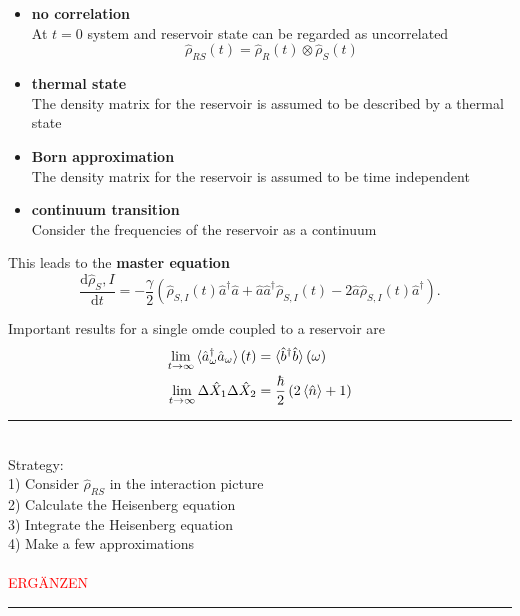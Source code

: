 \documentclass{article}
\newcommand{\diff}{\mathrm{d}}
\newcommand{\lr}[1]{\left(#1\right)}
\begin{document}
	\begin{itemize}
		\item \textbf{no correlation}\\
		At $t=0$ system and reservoir state can be regarded as uncorrelated
			$$\hat{\rho}_{RS}(t) = \hat{\rho}_R(t) \otimes \hat{\rho}_S(t)$$
		
		
		\item \textbf{thermal state}\\
		The density matrix for the reservoir is assumed to be described by a thermal state
		
		
		\item \textbf{Born approximation}\\
		The density matrix for the reservoir is assumed to be time independent
		
		
		\item \textbf{continuum transition}\\
		Consider the frequencies of the reservoir as a continuum
	\end{itemize}

This leads to the \textbf{master equation}
	\begin{equation}
		\frac{\diff \hat{\rho}_S,I}{\diff t} = - \frac{\gamma}{2} \lr{ \hat{\rho}_{S,I}(t) \hat{a}^\dagger \hat{a} + \hat{a}\hat{a}^\dagger \hat{\rho}_{S,I}(t) - 2 \hat{a} \hat{\rho}_{S,I}(t) \hat{a}^\dagger }.
	\end{equation}

Important results for a single omde coupled to a reservoir are
	\begin{align}
		\lim\limits_{t\to\infty} \braket{ \hat{a}_\omega^\dagger \hat{a}_\omega }(t) &= \braket{ \hat{b}^\dagger \hat{b} }(\omega) \\
		\lim\limits_{t\to\infty} \Delta\hat{X}_1 \Delta\hat{X}_2 &= \frac{\hbar}{2} \lr{ 2\braket{\hat{n}} + 1 }
	\end{align}

\vspace{0.5cm}

{\color{violet}
\hrule
	\\
	Strategy:\\
	1) Consider $\hat{\rho}_{RS}$ in the interaction picture \\
	2) Calculate the Heisenberg equation\\
	3) Integrate the Heisenberg equation\\
	4) Make a few approximations\\
	\\
	\textcolor{red}{ERGÄNZEN}
\hrule
}
\end{document}
